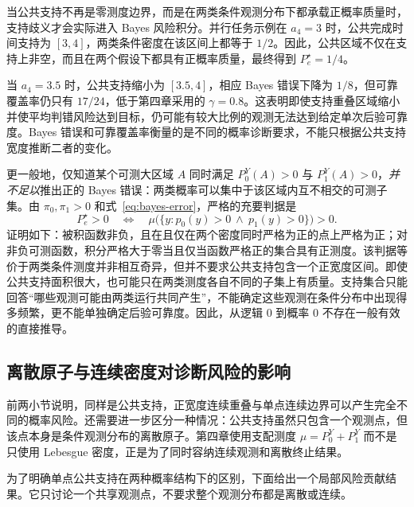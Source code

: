 \documentclass[master,fontset=ubuntu]{shnuthesis}
\DeclareRobustCommand{\logicstatus}[1]{\ensuremath{#1}}
\DeclareRobustCommand{\probstatus}[1]{\ensuremath{#1}}
\theoremstyle{definition}
\begin{document}
当公共支持不再是零测度边界，而是在两类条件观测分布下都承载正概率质量时，支持歧义才会实际进入 Bayes 风险积分。并行任务示例在 \(a_4=3\) 时，公共完成时间支持为 \([3,4]\)，两类条件密度在该区间上都等于 \(1/2\)。因此，公共区域不仅在支持上非空，而且在两个假设下都具有正概率质量，最终得到 \(P_e^\star=1/4\)。

当 \(a_4=3.5\) 时，公共支持缩小为 \([3.5,4]\)，相应 Bayes 错误下降为 \(1/8\)，但可靠覆盖率仍只有 \(17/24\)，低于第四章采用的 \(\gamma=0.8\)。这表明即使支持重叠区域缩小并使平均判错风险达到目标，仍可能有较大比例的观测无法达到给定单次后验可靠度。Bayes 错误和可靠覆盖率衡量的是不同的概率诊断要求，不能只根据公共支持宽度推断二者的变化。

更一般地，仅知道某个可测大区域 $A$ 同时满足 $P_0^Y(A)>0$ 与 $P_1^Y(A)>0$，\emph{并不足以}推出正的 Bayes 错误：两类概率可以集中于该区域内互不相交的可测子集。由 $\pi_0,\pi_1>0$ 和式~\eqref{eq:bayes-error}，严格的充要判据是
\begin{equation}
P_e^\star>0
\quad\Longleftrightarrow\quad
\mu\bigl(\{y:p_0(y)>0\ \wedge\ p_1(y)>0\}\bigr)>0.
\label{eq:positive-bayes-overlap}
\end{equation}
证明如下：被积函数非负，且在且仅在两个密度同时严格为正的点上严格为正；对非负可测函数，积分严格大于零当且仅当函数严格正的集合具有正测度。该判据等价于两类条件测度并非相互奇异，但并不要求公共支持包含一个正宽度区间。即使公共支持面积很大，也可能只在两类测度各自不同的子集上有质量。支持集合只能回答“哪些观测可能由两类运行共同产生”，不能确定这些观测在条件分布中出现得多频繁，更不能单独确定后验可靠度。因此，从逻辑 \logicstatus{0} 到概率 \probstatus{0} 不存在一般有效的直接推导。

\subsection{离散原子与连续密度对诊断风险的影响}

前两小节说明，同样是公共支持，正宽度连续重叠与单点连续边界可以产生完全不同的概率风险。还需要进一步区分一种情况：公共支持虽然只包含一个观测点，但该点本身是条件观测分布的离散原子。第四章使用支配测度 \(\mu=P_0^Y+P_1^Y\) 而不是只使用 Lebesgue 密度，正是为了同时容纳连续观测和离散终止结果。

为了明确单点公共支持在两种概率结构下的区别，下面给出一个局部风险贡献结果。它只讨论一个共享观测点，不要求整个观测分布都是离散或连续。
\end{document}
